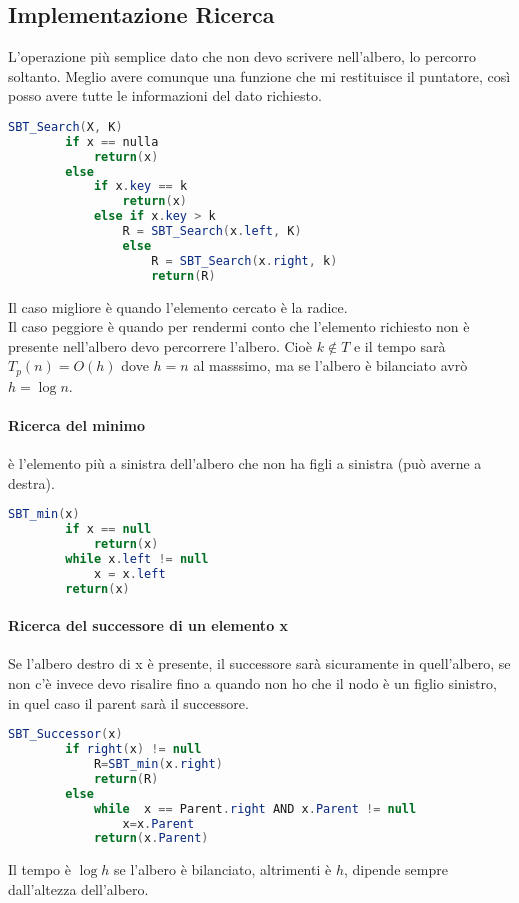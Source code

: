 \subsection{Implementazione Ricerca}
L'operazione più semplice dato che non devo scrivere nell'albero, lo percorro
soltanto. Meglio avere comunque una funzione che mi restituisce il puntatore,
così posso avere tutte le informazioni del dato richiesto.
\begin{lstlisting}[language=Java]
    SBT_Search(X, K)
        if x == nulla
            return(x)
        else
            if x.key == k
                return(x)
            else if x.key > k
                R = SBT_Search(x.left, K)
                else
                    R = SBT_Search(x.right, k)
                    return(R)
\end{lstlisting}
Il caso migliore è quando l'elemento cercato è la radice.\\
Il caso peggiore è quando per rendermi conto che l'elemento richiesto non è presente
nell'albero devo percorrere l'albero. Cioè $k \notin T$ e il tempo sarà $T_p(n)=O(h)$ dove
$h=n$ al masssimo, ma se l'albero è bilanciato avrò $h= \log n$.
\paragraph*{Ricerca del minimo} è l'elemento più a sinistra dell'albero che non ha figli a sinistra
(può averne a destra).
\begin{lstlisting}[language=Java]
    SBT_min(x)
        if x == null
            return(x)
        while x.left != null
            x = x.left
        return(x)
\end{lstlisting}
\paragraph*{Ricerca del successore di un elemento x} Se l'albero destro di x è presente, il
successore sarà sicuramente in quell'albero, se non c'è invece devo risalire fino a quando
non ho che il nodo è un figlio sinistro, in quel caso il parent sarà il successore.
\begin{lstlisting}[language=Java]
    SBT_Successor(x)
        if right(x) != null
            R=SBT_min(x.right)
            return(R)
        else
            while  x == Parent.right AND x.Parent != null
                x=x.Parent
            return(x.Parent)
\end{lstlisting}
Il tempo è $\log h$ se l'albero è bilanciato, altrimenti è $h$, dipende sempre dall'altezza
dell'albero.
